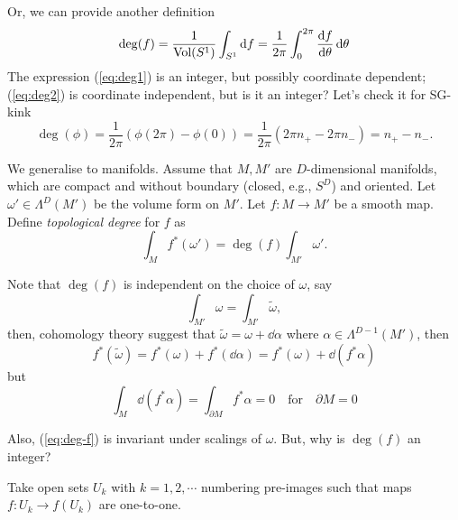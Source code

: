 \documentclass[a4paper,11pt]{article}
\begin{document}
    Or, we can provide another definition 
    \begin{equation}
        \deg(f) = \frac{1}{\text{Vol}(S^1)} \int_{S^1} \dd{f} = \frac{1}{2 \pi} \int_{0}^{2 \pi} \dv{f}{\theta} \dd{\theta} \label{eq:deg2}
    \end{equation}
    The expression (\ref{eq:deg1}) is an integer, but possibly coordinate dependent; (\ref{eq:deg2}) is coordinate independent, but is it an integer? Let's check it for SG-kink 
    \begin{equation}
        \deg(\phi) = \frac{1}{2 \pi}(\phi(2 \pi) - \phi(0)) = \frac{1}{2 \pi} (2 \pi n_+ - 2 \pi n_-) = n_+ - n_-.
    \end{equation}

    We generalise to manifolds. Assume that $M, M'$ are $D$-dimensional manifolds, which are compact and without boundary (closed, e.g., $S^D$) and oriented. Let $\omega' \in \Lambda^D(M')$ be the volume form on $M'$. Let $f: M \to M'$ be a smooth map. Define \emph{topological degree} for $f$ as
    \begin{equation}
        \int_M f^*(\omega') = \deg(f) \int_{M'} \omega'. \label{eq:deg-f}
    \end{equation} 


    Note that $\deg(f)$ is independent on the choice of $\omega$, say 
    \begin{equation}
        \int_{M'} \omega = \int_{M'} \tilde \omega,
    \end{equation}
    then, cohomology theory suggest that $\tilde \omega = \omega + \dd{\alpha}$ where $\alpha \in \Lambda^{D-1}(M')$, then 
    \begin{equation}
        f^*(\tilde{\omega}) = f^*(\omega) + f^*(\dd{\alpha}) = f^*(\omega) + \dd{(f^* \alpha)}
    \end{equation} 
    but 
    \begin{equation}
        \int_M \dd{(f^* \alpha)} = \int_{\partial M} f^* \alpha = 0 \quad \text{for} \quad \partial M = 0
    \end{equation}

    Also, (\ref{eq:deg-f}) is invariant under scalings of $\omega$. But, why is $\deg(f)$ an integer?

    Take open sets $U_k$ with $k=1,2,\cdots$ numbering pre-images such that maps $f: U_k \to f(U_k)$ are one-to-one.
\end{document}
